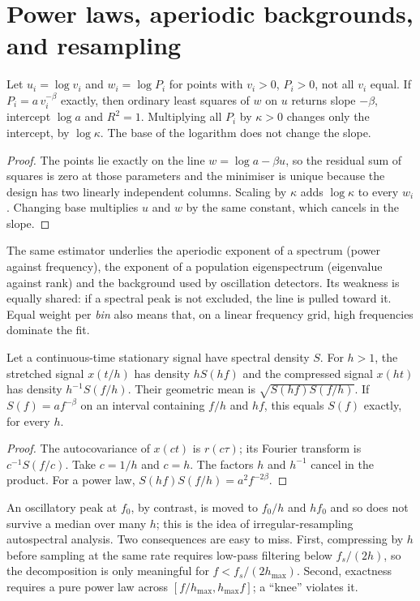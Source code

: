 \section{Power laws, aperiodic backgrounds, and resampling}
\begin{theorem}\label{ars:spec-007}
Let $u_i=\log v_i$ and $w_i=\log P_i$ for points with $v_i>0$, $P_i>0$, not all $v_i$ equal. If $P_i=a\,v_i^{-\beta}$ exactly, then ordinary least squares of $w$ on $u$ returns slope $-\beta$, intercept $\log a$ and $R^2=1$. Multiplying all $P_i$ by $\kappa>0$ changes only the intercept, by $\log\kappa$. The base of the logarithm does not change the slope.
\end{theorem}
\begin{proof}
The points lie exactly on the line $w=\log a-\beta u$, so the residual sum of squares is zero at those parameters and the minimiser is unique because the design has two linearly independent columns. Scaling by $\kappa$ adds $\log\kappa$ to every $w_i$. Changing base multiplies $u$ and $w$ by the same constant, which cancels in the slope.
\end{proof}
The same estimator underlies the aperiodic exponent of a spectrum (power against frequency), the exponent of a population eigenspectrum (eigenvalue against rank) and the background used by oscillation detectors. Its weakness is equally shared: if a spectral peak is not excluded, the line is pulled toward it. Equal weight per \emph{bin} also means that, on a linear frequency grid, high frequencies dominate the fit.

\begin{theorem}\label{ars:spec-008}
Let a continuous-time stationary signal have spectral density $S$. For $h>1$, the stretched signal $x(t/h)$ has density $hS(hf)$ and the compressed signal $x(ht)$ has density $h^{-1}S(f/h)$. Their geometric mean is $\sqrt{S(hf)S(f/h)}$. If $S(f)=af^{-\beta}$ on an interval containing $f/h$ and $hf$, this equals $S(f)$ exactly, for every $h$.
\end{theorem}
\begin{proof}
The autocovariance of $x(ct)$ is $r(c\tau)$; its Fourier transform is $c^{-1}S(f/c)$. Take $c=1/h$ and $c=h$. The factors $h$ and $h^{-1}$ cancel in the product. For a power law, $S(hf)S(f/h)=a^2f^{-2\beta}$.
\end{proof}
An oscillatory peak at $f_0$, by contrast, is moved to $f_0/h$ and $hf_0$ and so does not survive a median over many $h$; this is the idea of irregular-resampling autospectral analysis. Two consequences are easy to miss. First, compressing by $h$ before sampling at the same rate requires low-pass filtering below $f_s/(2h)$, so the decomposition is only meaningful for $f<f_s/(2h_{\max})$. Second, exactness requires a pure power law across $[f/h_{\max},h_{\max}f]$; a ``knee'' violates it.

